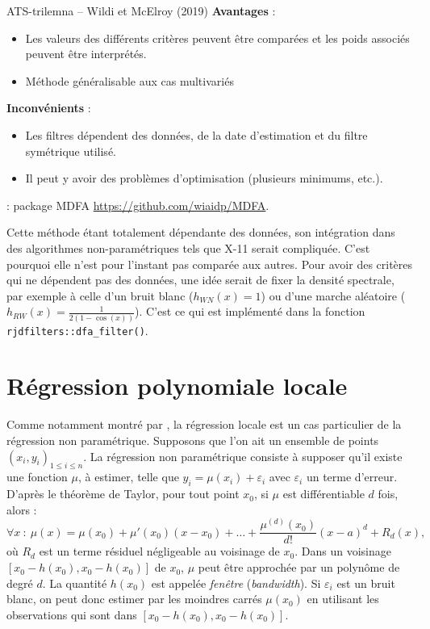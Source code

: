 \documentclass[
  11pt,
  french,
  a4paper]{article}
\newcommand\1{\mathds{1}}
\begin{document}
\begin{summary_box}{ATS-trilemna -- Wildi et McElroy (2019)}
\textbf{Avantages} :

\begin{itemize}
\item
  Les valeurs des différents critères peuvent être comparées et les poids associés peuvent être interprétés.
\item
  Méthode généralisable aux cas multivariés
\end{itemize}

\textbf{Inconvénients }:

\begin{itemize}
\item
  Les filtres dépendent des données, de la date d'estimation et du filtre symétrique utilisé.
\item
  Il peut y avoir des problèmes d'optimisation (plusieurs minimums, etc.).
\end{itemize}

\textbf{} : package MDFA \url{https://github.com/wiaidp/MDFA}.

\end{summary_box}

Cette méthode étant totalement dépendante des données, son intégration dans des algorithmes non-paramétriques tels que X-11 serait compliquée.
C'est pourquoi elle n'est pour l'instant pas comparée aux autres.
Pour avoir des critères qui ne dépendent pas des données, une idée serait de fixer la densité spectrale, par exemple à celle d'un bruit blanc (\(h_{WN}(x)=1\)) ou d'une marche aléatoire (\(h_{RW}(x)=\frac{1}{2(1-\cos(x))}\)).
C'est ce qui est implémenté dans la fonction \texttt{rjdfilters::dfa\_filter()}.

\hypertarget{sec-lppfilters}{%
\section{Régression polynomiale locale}\label{sec-lppfilters}}

Comme notamment montré par \textcite{Loader1999}, la régression locale est un cas particulier de la régression non paramétrique.
Supposons que l'on ait un ensemble de points \((x_i,y_i)_{1\leq i\leq n}\).
La régression non paramétrique consiste à supposer qu'il existe une fonction \(\mu\), à estimer, telle que \(y_i=\mu(x_i)+\varepsilon_i\) avec \(\varepsilon_i\) un terme d'erreur.
D'après le théorème de Taylor, pour tout point \(x_0\), si \(\mu\) est différentiable \(d\) fois, alors :
\[
\forall x \::\:\mu(x) = \mu(x_0) + \mu'(x_0)(x-x_0)+\dots +
\frac{\mu^{(d)}(x_0)}{d!}(x-a)^d+R_d(x),
\]
où \(R_d\) est un terme résiduel négligeable au voisinage de \(x_0\).
Dans un voisinage \(\left[x_0-h(x_0),x_0-h(x_0)\right]\) de \(x_0\), \(\mu\) peut être approchée par un polynôme de degré \(d\).
La quantité \(h(x_0)\) est appelée \emph{fenêtre} (\emph{bandwidth}).
Si \(\varepsilon_i\) est un bruit blanc, on peut donc estimer par les moindres carrés \(\mu(x_0)\) en utilisant les observations qui sont dans \(\left[x_0-h(x_0),x_0-h(x_0)\right]\).
\end{document}
